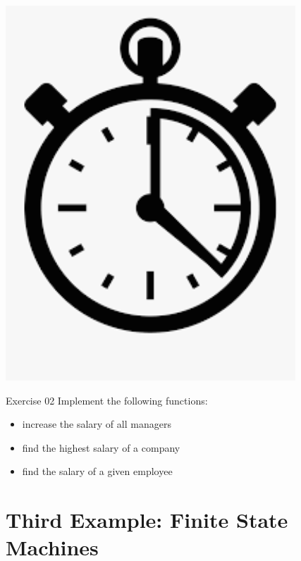 \documentclass{beamer}
\begin{document}
\begin{frame}
 \begin{center} 
   \includegraphics[scale=0.5]{images/timer.pdf}
 \end{center}   
\end{frame}

\begin{frame}
  \begin{block}{Exercise 02}
    Implement the following functions:

    \begin{itemize}
      \item increase the salary of all managers
      \item find the highest salary of a company
      \item find the salary of a given employee
    \end{itemize}
  \end{block}  
\end{frame}

\section{Third Example: Finite State Machines}

\end{document}
